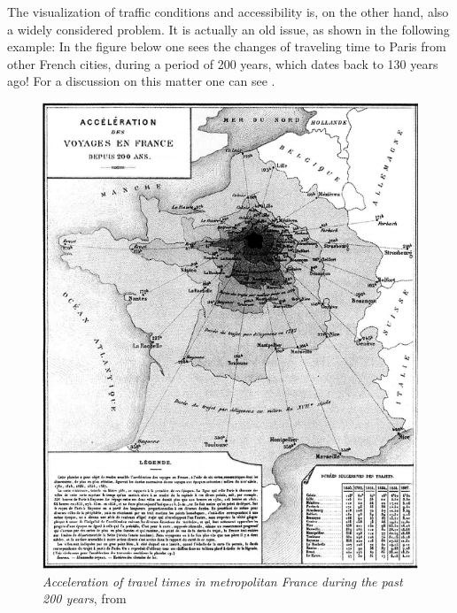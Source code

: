 \documentclass{vgtc}                          %
\begin{document}


The visualization of traffic conditions and accessibility is, on the other hand, also a widely considered problem. It is actually an old issue, as shown in the following example: In the figure below one sees the changes of traveling time to Paris from other French cities, during a period of 200 years, which dates back to 130 years ago! For a discussion on this matter one can see \cite{schoedon2016interactive}.






\begin{figure}[h]
 \centering %
 \includegraphics[scale=1, width=\columnwidth]{Vieille_Carte.png}
 \caption{\textit{Acceleration of travel times in metropolitan France during the past 200 years}, from \cite{Cheysson} }
 \label{fig:sample}
\end{figure}
\end{document}
